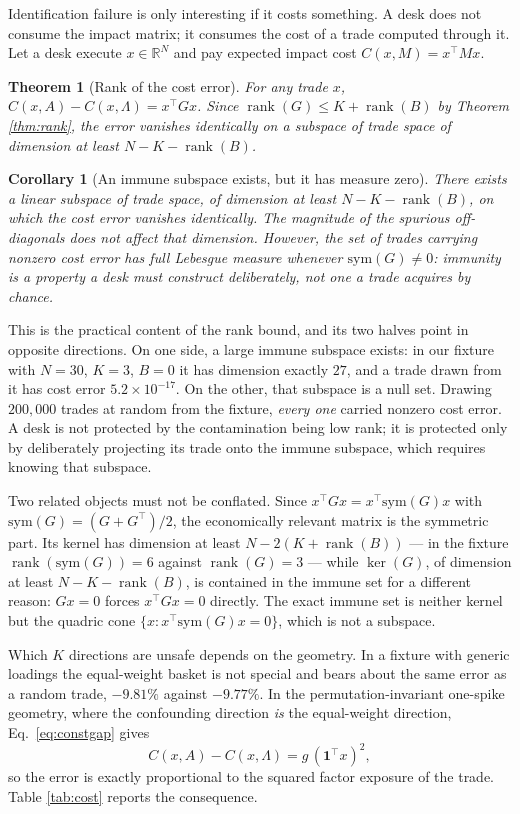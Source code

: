 \documentclass[10pt,twocolumn]{article}
\newtheorem{theorem}{Theorem}
\newtheorem{corollary}{Corollary}
\theoremstyle{remark}
\newcommand{\R}{\mathbb{R}}
\newcommand{\rank}{\operatorname{rank}}
\begin{document}
Identification failure is only interesting if it costs something. A desk does
not consume the impact matrix; it consumes the cost of a trade computed through
it. Let a desk execute $x\in\R^N$ and pay expected impact cost
$C(x,M)=x^\top Mx$.

\begin{theorem}[Rank of the cost error]
\label{thm:cost}
For any trade $x$, $C(x,A)-C(x,\Lambda)=x^\top Gx$. Since
$\rank(G)\le K+\rank(B)$ by Theorem \ref{thm:rank}, the error vanishes
identically on a subspace of trade space of dimension at least
$N-K-\rank(B)$.
\end{theorem}

\begin{corollary}[An immune subspace exists, but it has measure zero]
\label{cor:safe}
There exists a linear subspace of trade space, of dimension at least
$N-K-\rank(B)$, on which the cost error vanishes identically. The magnitude of
the spurious off-diagonals does not affect that dimension. \emph{However}, the
set of trades carrying nonzero cost error has full Lebesgue measure whenever
$\mathrm{sym}(G)\neq0$: immunity is a property a desk must construct
deliberately, not one a trade acquires by chance.
\end{corollary}

This is the practical content of the rank bound, and its two halves point in
opposite directions. On one side, a large immune subspace exists: in our
fixture with $N=30$, $K=3$, $B=0$ it has dimension exactly $27$, and a trade
drawn from it has cost error $5.2\times10^{-17}$. On the other, that subspace
is a null set. Drawing $200{,}000$ trades at random from the fixture,
\emph{every one} carried nonzero cost error. A desk is not protected by the
contamination being low rank; it is protected only by deliberately projecting
its trade onto the immune subspace, which requires knowing that subspace.

Two related objects must not be conflated. Since $x^\top Gx=x^\top
\mathrm{sym}(G)x$ with $\mathrm{sym}(G)=(G+G^\top)/2$, the economically
relevant matrix is the symmetric part. Its kernel has dimension at least
$N-2(K+\rank(B))$ --- in the fixture $\rank(\mathrm{sym}(G))=6$ against
$\rank(G)=3$ --- while $\ker(G)$, of dimension at least $N-K-\rank(B)$, is
contained in the immune set for a different reason: $Gx=0$ forces
$x^\top Gx=0$ directly. The exact immune set is neither kernel but the quadric
cone $\{x:x^\top\mathrm{sym}(G)x=0\}$, which is not a subspace.

Which $K$ directions are unsafe depends on the geometry. In a fixture with
generic loadings the equal-weight basket is not special and bears about the
same error as a random trade, $-9.81\%$ against $-9.77\%$. In the
permutation-invariant one-spike geometry, where the confounding direction
\emph{is} the equal-weight direction, Eq.~\eqref{eq:constgap} gives
\begin{equation}
C(x,A)-C(x,\Lambda)=g\,(\mathbf 1^\top x)^2,
\label{eq:exposurelaw}
\end{equation}
so the error is exactly proportional to the squared factor exposure of the
trade. Table \ref{tab:cost} reports the consequence.
\end{document}
